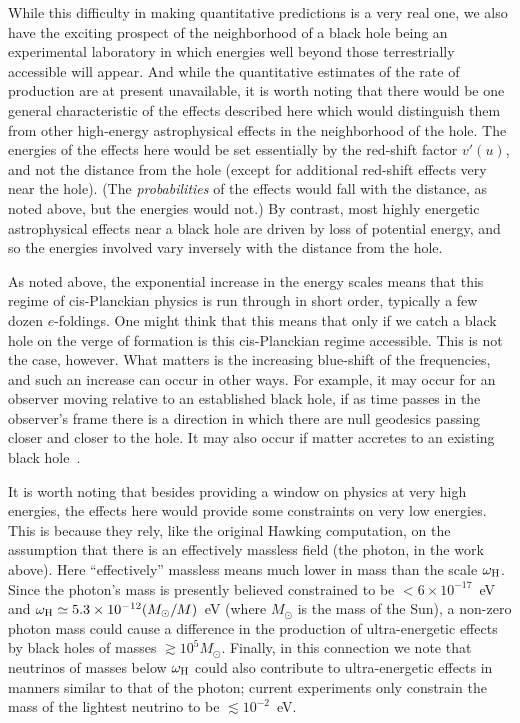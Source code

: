 \documentclass[11pt]{article}
\begin{document}
While this difficulty in making quantitative predictions is a very real one, we
also have the exciting prospect of the neighborhood of a black hole being an
experimental laboratory in which energies well beyond those terrestrially
accessible will appear.  And while the quantitative estimates of the rate of
production are at present unavailable, it is worth noting that there would be
one general characteristic of the effects described here which would distinguish
them from other high-energy astrophysical effects in the neighborhood of the
hole.  The energies of the effects here would be set essentially by the
red-shift factor $v'(u)$, and not the distance from the hole
(except for
additional red-shift effects very near the hole).  (The {\em probabilities}
of the effects would fall with the distance, as noted above, but the energies
would not.)  By contrast, most highly energetic astrophysical effects near a
black hole are driven by loss of potential energy, and so the energies involved
vary inversely with the distance from the hole.

As noted above, the exponential increase in the energy scales means that this
regime of cis-Planckian physics is run through in short order, typically a few
dozen $e$-foldings.   One might think that this means that only if we catch a
black hole on the verge of formation is this cis-Planckian regime accessible. 
This is not the case, however.  What matters is the increasing blue-shift of
the frequencies, and such an increase  can occur in other ways.  For example,
it may occur for an observer moving relative to an established black hole, if
as time passes in the observer's frame there is a direction in which there are
null geodesics passing closer and closer to the hole. It may also occur if
matter accretes to an existing black hole~\cite{Helfer:2001}.

It is worth noting that besides providing a window on physics at very high
energies, the effects here would provide some constraints on very low
energies.  This is because they rely, like the original Hawking computation, on
the assumption that there is an effectively massless field (the photon, in the
work above).   Here ``effectively'' massless means much lower in mass than the
scale $\omega _{\rm H}$.  Since the photon's mass is presently believed
constrained to be $<6\times 10^{-17}$~eV \cite{Eidelman:2004} and $\omega _{\rm
H}\simeq 5.3\times 10^{-12} (M_\odot /M)$~eV (where $M_\odot$ is the mass of
the Sun), a non-zero photon mass could cause a difference in the production of 
ultra-energetic effects by black holes of masses $\gtrsim 10^5 M_\odot$. 
Finally, in this connection we note that neutrinos of masses below $\omega
_{\rm H}$ could also contribute to ultra-energetic effects in manners similar
to that of the photon; current experiments only constrain the mass of the
lightest neutrino to be $\lesssim 10^{-2}$~eV.
\end{document}
